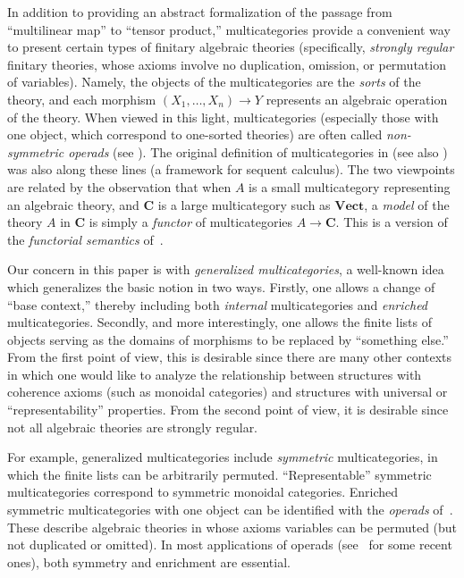 \documentclass{tac}
\newcommand{\mb}[1]{{\mathbf{#1}}}
\numberwithin{equation}{section}
\begin{document}
In addition to providing an abstract formalization of the passage from
``multilinear map'' to ``tensor product,'' multicategories provide a
convenient way to present certain types of finitary algebraic theories
(specifically, \emph{strongly regular} finitary theories, whose axioms
involve no duplication, omission, or permutation of variables).
Namely, the objects of the multicategories are the \emph{sorts} of the
theory, and each morphism $(X_1,\dots,X_n)\to Y$ represents an
algebraic operation of the theory.  When
viewed in this light, multicategories (especially those with one
object, which correspond to one-sorted theories) are often called
\emph{non-symmetric operads} (see \cite{may:goils}).
The original definition of multicategories in
\cite{lambek:dedsys-ii} (see also \cite{lambek:multi-revis}) was also
along these lines (a framework for sequent calculus).  The two
viewpoints are related by the observation that when $A$ is a small
multicategory representing an algebraic theory, and $\mb{C}$ is a
large multicategory such as $\mb{Vect}$, a \emph{model} of the theory
$A$ in $\mb{C}$ is simply a \emph{functor} of multicategories
$A\to\mb{C}$.  This is a version of the \emph{functorial
  semantics} of~\cite{lawvere:functsem}.

Our concern in this paper is with \emph{generalized multicategories},
a well-known idea which generalizes the basic notion in two ways.
Firstly, one allows a
change of ``base context,'' thereby including both \emph{internal}
multicategories and \emph{enriched} multicategories.  Secondly,
and more interestingly, one allows the finite lists of objects serving
as the domains of morphisms to be replaced by ``something else.''
From the first point of view, this is desirable since there are many
other contexts in which one would like to analyze the relationship
between structures with coherence axioms (such as monoidal categories)
and structures with universal or ``representability'' properties.
From the second point of view, it is desirable since not all
algebraic theories are strongly regular.

For example, generalized multicategories include \emph{symmetric}
multicategories, in which the finite lists can be arbitrarily
permuted.  ``Representable'' symmetric multicategories correspond to
symmetric monoidal categories.
Enriched symmetric multicategories with one object can be identified
with the \emph{operads} of~\cite{may:goils,kelly:operads,km:oamm}.
These describe algebraic theories in whose axioms variables can be
permuted (but not duplicated or omitted).  In most applications of
operads (see~\cite{em:rma-infloop,brgmoer:operads} for some recent
ones), both symmetry and enrichment are essential.
\end{document}

